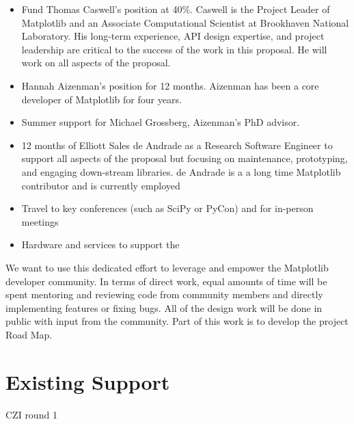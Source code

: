\documentclass[12pt,letterpaper]{article}  %
\begin{document}
\begin{itemize}[noitemsep]

\item Fund Thomas Caswell's position at 40\%.  Caswell is the Project Leader of Matplotlib and an Associate
  Computational Scientist at Brookhaven National Laboratory.  His
  long-term experience, API design expertise, and project leadership
  are critical to the success of the work in this proposal.  He will work
  on all aspects of the proposal.
\item Hannah Aizenman's position for 12 months.  Aizenman has
  been a core developer of Matplotlib for four years.
\item Summer support for Michael Grossberg, Aizenman's PhD advisor.
\item 12 months of Elliott Sales de Andrade as a Research Software
  Engineer to support all aspects of the proposal but focusing on
  maintenance, prototyping, and engaging down-stream libraries.  de Andrade is a
  a long time Matplotlib contributor and is currently employed
\item Travel to key conferences (such as SciPy or PyCon) and for in-person meetings
\item Hardware and services to support the
\end{itemize}

We want to use this dedicated effort to leverage and empower the
Matplotlib developer community.  In terms of direct work, equal
amounts of time will be spent mentoring and reviewing code from
community members and directly implementing features or fixing bugs.
All of the design work will be done in public with input from the
community. Part of this work is to develop the project Road Map.



\section{Existing Support}
CZI round 1



\clearpage

\end{document}
